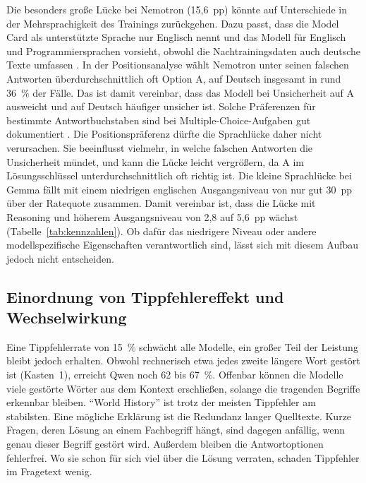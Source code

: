 \documentclass[a4paper,titlepage]{article}
\numberwithin{equation}{section} %
\begin{document}
Die besonders große Lücke bei Nemotron (15,6~pp) könnte auf Unterschiede in der Mehrsprachigkeit des Trainings zurückgehen. Dazu passt, dass die Model Card als unterstützte Sprache nur Englisch nennt und das Modell für Englisch und Programmiersprachen vorsieht, obwohl die Nachtrainingsdaten auch deutsche Texte umfassen \citep{noauthor_nvidianvidia-nemotron-3-nano-4b-bf16_2026}. In der Positionsanalyse wählt Nemotron unter seinen falschen Antworten überdurchschnittlich oft Option A, auf Deutsch insgesamt in rund 36~\% der Fälle. Das ist damit vereinbar, dass das Modell bei Unsicherheit auf A ausweicht und auf Deutsch häufiger unsicher ist. Solche Präferenzen für bestimmte Antwortbuchstaben sind bei Multiple-Choice-Aufgaben gut dokumentiert \citep{zheng_large_2024, pezeshkpour_large_2023}. Die Positionspräferenz dürfte die Sprachlücke daher nicht verursachen. Sie beeinflusst vielmehr, in welche falschen Antworten die Unsicherheit mündet, und kann die Lücke leicht vergrößern, da A im Lösungsschlüssel unterdurchschnittlich oft richtig ist. Die kleine Sprachlücke bei Gemma fällt mit einem niedrigen englischen Ausgangsniveau von nur gut 30~pp über der Ratequote zusammen. Damit vereinbar ist, dass die Lücke mit Reasoning und höherem Ausgangsniveau von 2,8 auf 5,6~pp wächst (Tabelle~\ref{tab:kennzahlen}). Ob dafür das niedrigere Niveau oder andere modellspezifische Eigenschaften verantwortlich sind, lässt sich mit diesem Aufbau jedoch nicht entscheiden.


\subsection{Einordnung von Tippfehlereffekt und Wechselwirkung}\label{sec:einordnung-tippfehler}

Eine Tippfehlerrate von 15~\% schwächt alle Modelle, ein großer Teil der Leistung bleibt jedoch erhalten. Obwohl rechnerisch etwa jedes zweite längere Wort gestört ist (Kasten~1), erreicht Qwen noch 62 bis 67~\%. Offenbar können die Modelle viele gestörte Wörter aus dem Kontext erschließen, solange die tragenden Begriffe erkennbar bleiben. "`World History"' ist trotz der meisten Tippfehler am stabilsten. Eine mögliche Erklärung ist die Redundanz langer Quelltexte. Kurze Fragen, deren Lösung an einem Fachbegriff hängt, sind dagegen anfällig, wenn genau dieser Begriff gestört wird. Außerdem bleiben die Antwortoptionen fehlerfrei. Wo sie schon für sich viel über die Lösung verraten, schaden Tippfehler im Fragetext wenig.
\end{document}
